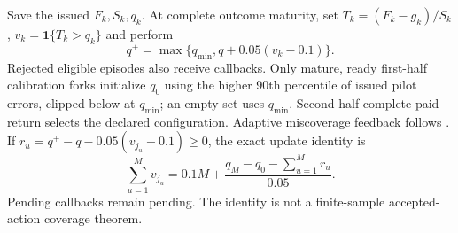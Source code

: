 \documentclass[10pt]{article}
\begin{document}
Save the issued $F_k,S_k,q_k$. At complete outcome maturity, set
$T_k=(F_k-g_k)/S_k$, $v_k=\mathbf1\{T_k>q_k\}$ and perform
\begin{equation}
 q^+=\max\{q_{\min},q+0.05(v_k-0.1)\}.
 \label{eq:delayed-calibration-update}
\end{equation}
Rejected eligible episodes also receive callbacks. Only mature, ready
first-half calibration forks initialize $q_0$ using the higher 90th
percentile of issued pilot errors, clipped below at $q_{\min}$; an empty
set uses $q_{\min}$. Second-half complete paid return selects the declared
configuration. Adaptive miscoverage feedback follows \cite{gibbs2021}.
If $r_u=q^+-q-0.05(v_{j_u}-0.1)\geq0$, the exact update identity is
\begin{equation}
 \sum_{u=1}^{M}v_{j_u}
 =0.1M+\frac{q_M-q_0-\sum_{u=1}^{M}r_u}{0.05}.
 \label{eq:delayed-calibration-accounting}
\end{equation}
Pending callbacks remain pending. The identity is not a finite-sample
accepted-action coverage theorem.
\end{document}
